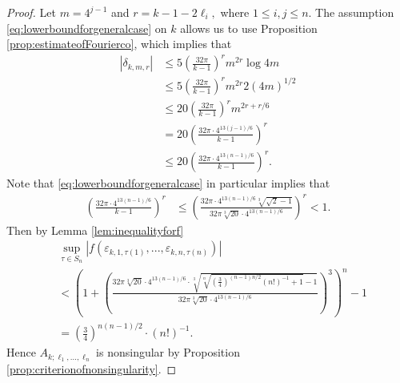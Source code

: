 \documentclass[11pt,letterpaper,reqno]{amsart}
\numberwithin{figure}{section}
\numberwithin{table}{section}
\theoremstyle{definition}
\theoremstyle{plain}
\theoremstyle{definition}
\theoremstyle{definition}
\theoremstyle{remark}
\numberwithin{equation}{section}
\theoremstyle{remark}
\begin{document}
\begin{proof}
   Let $m=4^{j-1}$ and $r=k-1-2\ell_i,$ where $ 1\leq i,j\leq n$. The assumption \eqref{eq:lowerboundforgeneralcase} on $k$ allows us to use Proposition \ref{prop:estimateofFourierco}, which implies that
   \begin{align}
|\delta_{k,m,r}|&\leq5\left(\frac{32\pi}{k-1}\right)^rm^{2r}\log4m\\&\leq
 5\left(\frac{32\pi}{k-1}\right)^rm^{2r}2(4m)^{1/2}\\&\leq20\left(\frac{32\pi}{k-1}\right)^rm^{2r+r/6}\\&=20\left(\frac{32\pi\cdot4^{13(j-1)/6}}{k-1}\right)^r\\&\leq20\left(\frac{32\pi\cdot4^{13(n-1)/6}}{k-1}\right)^r.\end{align}
 Note that \eqref{eq:lowerboundforgeneralcase} in particular implies that
 \begin{align}
  \left(\frac{32\pi\cdot4^{13(n-1)/6}}{k-1}\right)^r&\leq\left(\frac{32\pi\cdot4^{13(n-1)/6}\sqrt[3]{\sqrt{2}-1}}{32\pi\sqrt[3]{20}\cdot4^{13(n-1)/6}}\right)^r<1.
 \end{align}
Then by Lemma \ref{lem:inequalityforf}
   \begin{align}&\sup_{\tau\in S_n}|f(\varepsilon_{k,1,\tau(1)},...,\varepsilon_{k,n,\tau(n)})|\\&<\left(1+\left(\frac{32\pi\sqrt[3]{20}\cdot4^{13(n-1)/6}\cdot\sqrt[3]{\sqrt[n]{\left(\frac{3}{4}\right)^{(n-1)n/2}(n!)^{-1}+1}-1}}{32\pi\sqrt[3]{20}\cdot4^{13(n-1)/6}}\right)^3\right)^n-1\\&=\left(\frac{3}{4}\right)^{n(n-1)/2}\cdot(n!)^{-1}.\end{align}
   Hence $A_{k;\ell_1,...,\ell_n}$ is nonsingular by Proposition \ref{prop:criterionofnonsingularity}.
\end{proof}
\end{document}
